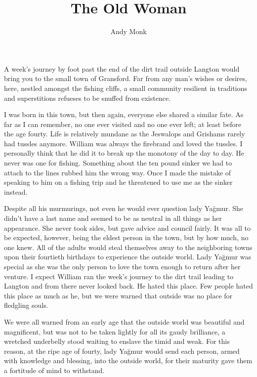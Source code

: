 \documentclass[9pt]{memoir}
\title{The Old Woman}
\author{Andy Monk}
\date{}
\begin{document}
\clearpage
\maketitle
\thispagestyle{empty}

\mainmatter

A week's journey by foot past the end of the dirt trail outside Langton would bring you to the small town of Gransford. Far from any man's wishes or desires, here, nestled amongst the fishing cliffs, a small community resilient in traditions and superstitions refueses to be snuffed from existence.

I was born in this town, but then again, everyone else shared a similar fate. As far as I can remember, no one ever visited and no one ever left; at least before the age fourty. Life is relatively mundane as the Jeswalops and Grishams rarely had tussles anymore. William was always the firebrand and loved the tussles. I personally think that he did it to break up the monotony of the day to day. He never was one for fishing. Something about the ten pound sinker we had to attach to the lines rubbed him the wrong way. Once I made the mistake of speaking to him on a fishing trip and he threatened to use me as the sinker instead.

Despite all his murmurings, not even he would ever question lady Yağmur. She didn't have a last name and seemed to be as neutral in all things as her appearance. She never took sides, but gave advice and council fairly. It was all to be expected, however, being the eldest person in the town, but by how much, no one knew. All of the adults would steal themselves away to the neighboring towns upon their fourtieth birthdays to experience the outside world. Lady Yağmur was special as she was the only person to love the town enough to return after her venture. I expect William ran the week's journey to the dirt trail leading to Langton and from there never looked back. He hated this place. Few people hated this place as much as he, but we were warned that outside was no place for fledgling souls.

We were all warned from an early age that the outside world was beautiful and magnificent, but was not to be taken lightly for all its gaudy brilliance, a wretched underbelly stood waiting to enslave the timid and weak. For this reason, at the ripe age of fourty, lady Yağmur would send each person, armed with knowledge and blessing, into the outside world, for their maturity gave them a fortitude of mind to withstand.
\end{document}
